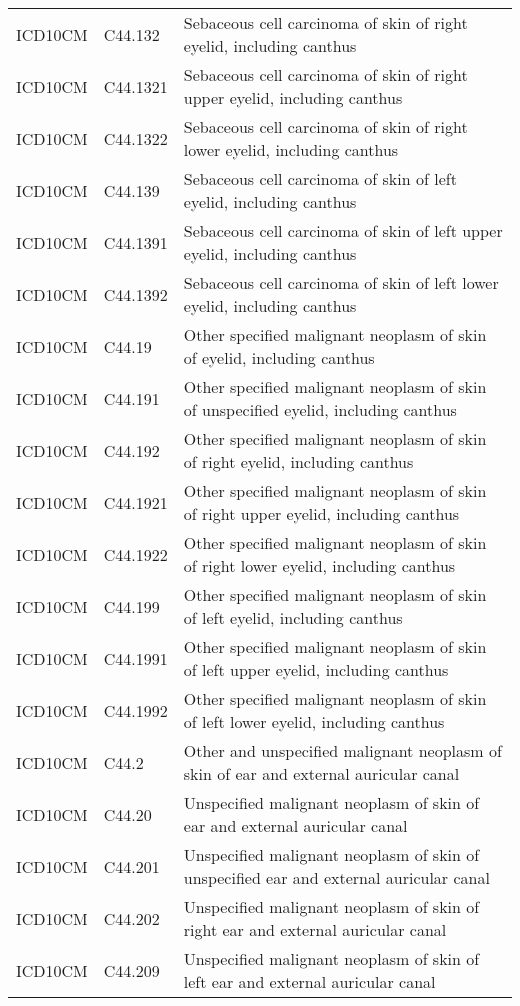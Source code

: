 \begin{longtable}{p{}p{}p{}}
  ICD10CM & C44.132 & Sebaceous cell carcinoma of skin of right eyelid, including canthus \\ 
  ICD10CM & C44.1321 & Sebaceous cell carcinoma of skin of right upper eyelid, including canthus \\ 
  ICD10CM & C44.1322 & Sebaceous cell carcinoma of skin of right lower eyelid, including canthus \\ 
  ICD10CM & C44.139 & Sebaceous cell carcinoma of skin of left eyelid, including canthus \\ 
  ICD10CM & C44.1391 & Sebaceous cell carcinoma of skin of left upper eyelid, including canthus \\ 
  ICD10CM & C44.1392 & Sebaceous cell carcinoma of skin of left lower eyelid, including canthus \\ 
  ICD10CM & C44.19 & Other specified malignant neoplasm of skin of eyelid, including canthus \\ 
  ICD10CM & C44.191 & Other specified malignant neoplasm of skin of unspecified eyelid, including canthus \\ 
  ICD10CM & C44.192 & Other specified malignant neoplasm of skin of right eyelid, including canthus \\ 
  ICD10CM & C44.1921 & Other specified malignant neoplasm of skin of right upper eyelid, including canthus \\ 
  ICD10CM & C44.1922 & Other specified malignant neoplasm of skin of right lower eyelid, including canthus \\ 
  ICD10CM & C44.199 & Other specified malignant neoplasm of skin of left eyelid, including canthus \\ 
  ICD10CM & C44.1991 & Other specified malignant neoplasm of skin of left upper eyelid, including canthus \\ 
  ICD10CM & C44.1992 & Other specified malignant neoplasm of skin of left lower eyelid, including canthus \\ 
  ICD10CM & C44.2 & Other and unspecified malignant neoplasm of skin of ear and external auricular canal \\ 
  ICD10CM & C44.20 & Unspecified malignant neoplasm of skin of ear and external auricular canal \\ 
  ICD10CM & C44.201 & Unspecified malignant neoplasm of skin of unspecified ear and external auricular canal \\ 
  ICD10CM & C44.202 & Unspecified malignant neoplasm of skin of right ear and external auricular canal \\ 
  ICD10CM & C44.209 & Unspecified malignant neoplasm of skin of left ear and external auricular canal \\ 

\end{longtable}
